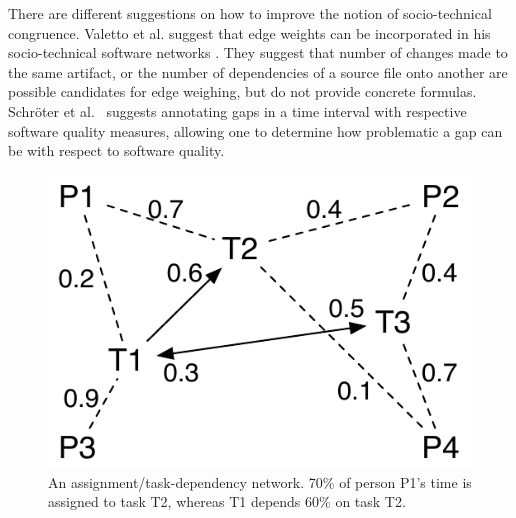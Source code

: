 \documentclass[times, 10pt,twocolumn]{article}
\begin{document}
There are different suggestions on how to improve the notion of socio-technical congruence.
Valetto et al. suggest that edge weights can be incorporated in his socio-technical software networks \cite{valetto2007}. 
They suggest that number of changes made to the same artifact, or the number of dependencies of a source file onto another are possible candidates for edge weighing, but do not provide concrete formulas. 
Schr\"oter et al.~\cite{schroeter2008:rsse} suggests annotating gaps in a time interval with respective software quality measures, allowing one to determine how problematic a gap can be with respect to software quality.

\begin{figure}[t]
	\centering
	\includegraphics[width=.6\columnwidth]{figures/peopleTaskAssignment}
	\caption{An assignment/task-dependency network. 70\% of person P1's time is assigned to task T2, whereas T1 depends 60\% on task T2.}
	\label{fig:assignment}
\end{figure}
\end{document}
